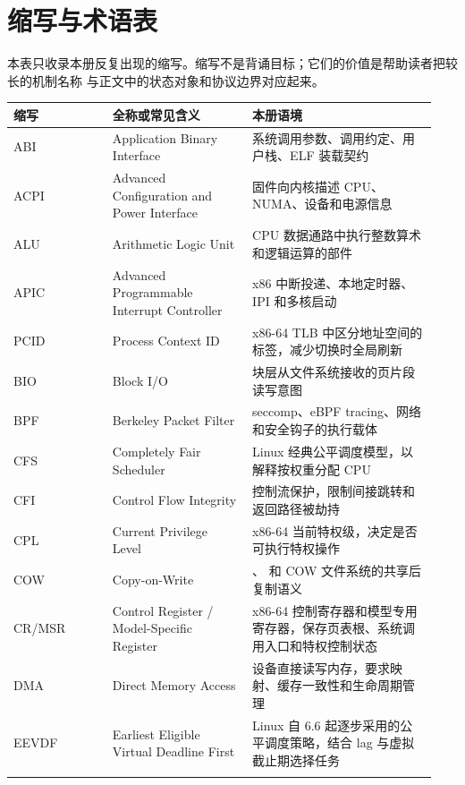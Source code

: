 \chapter*{缩写与术语表}

本表只收录本册反复出现的缩写。缩写不是背诵目标；它们的价值是帮助读者把较长的机制名称
与正文中的状态对象和协议边界对应起来。

\begin{longtable}{|L{0.22\linewidth}|L{0.31\linewidth}|L{0.41\linewidth}|}
\toprule
缩写 & 全称或常见含义 & 本册语境 \\
\midrule
ABI & Application Binary Interface & 系统调用参数、调用约定、用户栈、ELF 装载契约 \\\tablerowrule
ACPI & Advanced Configuration and Power Interface & 固件向内核描述 CPU、NUMA、设备和电源信息 \\\tablerowrule
ALU & Arithmetic Logic Unit & CPU 数据通路中执行整数算术和逻辑运算的部件 \\\tablerowrule
APIC & Advanced Programmable Interrupt Controller & x86 中断投递、本地定时器、IPI 和多核启动 \\\tablerowrule
PCID & Process Context ID & x86-64 TLB 中区分地址空间的标签，减少切换时全局刷新 \\\tablerowrule
BIO & Block I/O & 块层从文件系统接收的页片段读写意图 \\\tablerowrule
BPF & Berkeley Packet Filter & seccomp、eBPF tracing、网络和安全钩子的执行载体 \\\tablerowrule
CFS & Completely Fair Scheduler & Linux 经典公平调度模型，以  解释按权重分配 CPU \\\tablerowrule
CFI & Control Flow Integrity & 控制流保护，限制间接跳转和返回路径被劫持 \\\tablerowrule
CPL & Current Privilege Level & x86-64 当前特权级，决定是否可执行特权操作 \\\tablerowrule
COW & Copy-on-Write & 、 和 COW 文件系统的共享后复制语义 \\\tablerowrule
CR/MSR & Control Register / Model-Specific Register & x86-64 控制寄存器和模型专用寄存器，保存页表根、系统调用入口和特权控制状态 \\\tablerowrule
DMA & Direct Memory Access & 设备直接读写内存，要求映射、缓存一致性和生命周期管理 \\\tablerowrule
EEVDF & Earliest Eligible Virtual Deadline First & Linux 自 6.6 起逐步采用的公平调度策略，结合 lag 与虚拟截止期选择任务 \\\tablerowrule

\end{longtable}
